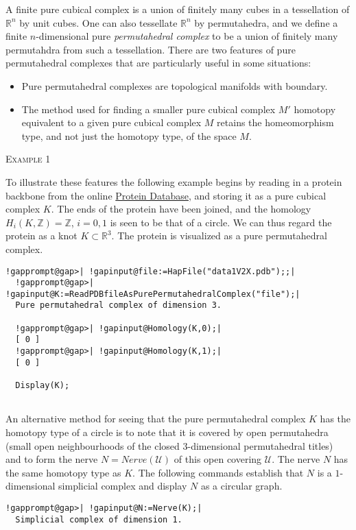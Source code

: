 \documentclass[a4paper,11pt]{report}
\begin{document}
{{A finite pure cubical complex is a union of finitely many cubes in a
tessellation of $\mathbb R^n$ by unit cubes. One can also tessellate $\mathbb R^n$ by permutahedra, and we define a finite $n$-dimensional pure \emph{permutahedral complex} to be a union of finitely many permutahdra from such a tessellation. There are
two features of pure permutahedral complexes that are particularly useful in
some situations: 
\begin{itemize}
\item  Pure permutahedral complexes are topological manifolds with boundary. 
\item  The method used for finding a smaller pure cubical complex $M'$ homotopy equivalent to a given pure cubical complex $M$ retains the homeomorphism type, and not just the homotopy type, of the space $M$.
\end{itemize}
 

\textsc{Example 1} 

To illustrate these features the following example begins by reading in a
protein backbone from the online \href{https://www.rcsb.org/} {Protein Database}, and storing it as a pure cubical complex $K$. The ends of the protein have been joined, and the homology $H_i(K,\mathbb Z)=\mathbb Z$, $i=0,1$ is seen to be that of a circle. We can thus regard the protein as a knot $K\subset \mathbb R^3$. The protein is visualized as a pure permutahedral complex. 
\begin{Verbatim}[commandchars=!@|,fontsize=\small,frame=single,label=Example]
  !gapprompt@gap>| !gapinput@file:=HapFile("data1V2X.pdb");;|
  !gapprompt@gap>| !gapinput@K:=ReadPDBfileAsPurePermutahedralComplex("file");|
  Pure permutahedral complex of dimension 3.
  
  !gapprompt@gap>| !gapinput@Homology(K,0);|
  [ 0 ]
  !gapprompt@gap>| !gapinput@Homology(K,1);|
  [ 0 ]
  
  Display(K);
  
\end{Verbatim}
  

An alternative method for seeing that the pure permutahedral complex $K$ has the homotopy type of a circle is to note that it is covered by open
permutahedra (small open neighbourhoods of the closed $3$-dimensional permutahedral titles) and to form the nerve $N=Nerve({\mathcal U})$ of this open covering $\mathcal U$. The nerve $N$ has the same homotopy type as $K$. The following commands establish that $N$ is a $1$-dimensional simplicial complex and display $N$ as a circular graph. 
\begin{Verbatim}[commandchars=!@|,fontsize=\small,frame=single,label=Example]
  !gapprompt@gap>| !gapinput@N:=Nerve(K);|
  Simplicial complex of dimension 1.
  

\end{Verbatim}}}
\end{document}
